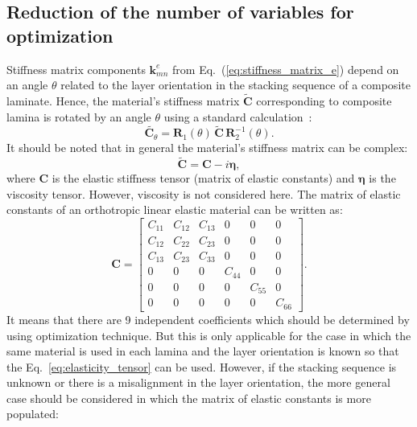 \documentclass[preprint,12pt]{elsarticle}
\newcommand{\matr}[1]{\mathbf{#1}} %
\newcommand{\bs}[1]{\boldsymbol{#1}}
\begin{document}
 \subsection{Reduction of the number of variables for optimization}
 Stiffness matrix components $\matr{k}_{mn}^e$ from Eq.~(\ref{eq:stiffness_matrix_e}) depend on an angle $\theta$ related to the layer orientation in the stacking sequence of a composite laminate. Hence, the material's stiffness matrix $\tilde{\matr{C}}$ corresponding to composite lamina is rotated by an angle $\theta$ using a standard calculation~\cite{Bartoli2006,Taupin2011}:
 \begin{equation}
	\tilde{ \matr{C}_{\theta}}= \matr{R}_1(\theta) \,\tilde{\matr{C}} \,\matr{R}_2^{-1}(\theta).
	 \label{eq:elasticity_tensor}
 \end{equation}
 It should be noted that in general the material's stiffness matrix can be complex:
 \begin{equation}
 \tilde{\matr{C}}= \matr{C} - i \bs{\eta},
 \label{eq:complex_elasticity_tensor}
 \end{equation}
 where $\matr{C} $ is the elastic stiffness tensor (matrix of elastic constants) and $\bs{\eta}$ is the viscosity tensor. However, viscosity is not considered here. The matrix of elastic constants of an orthotropic linear elastic material can be written as:
 \begin{equation}
 \matr{C} = \left[\begin{array}{cccccc} C_{11} & C_{12}& C_{13} & 0&0&0\\[2pt]
 C_{12}& C_{22} & C_{23}& 0&0&0\\[2pt]
 C_{13}&C_{23}&C_{33}&0&0&0\\[2pt]
 0& 0 &0&C_{44}& 0&0\\[2pt]
 0&0&0&0&C_{55}&0\\[2pt]
  0&0&0&0&0&C_{66}
  \end{array}\right]. 
  \label{eq:elastic_constatns}
 \end{equation} 
 It means that there are 9 independent coefficients which should be determined by using optimization technique. But this is only applicable for the case in which the same material is used in each lamina and the layer orientation is known so that the Eq.~\ref{eq:elasticity_tensor} can be used. However, if the stacking sequence is unknown or there is a misalignment in the layer orientation, the more general case should be considered in which the matrix of elastic constants is more populated:
\end{document}
